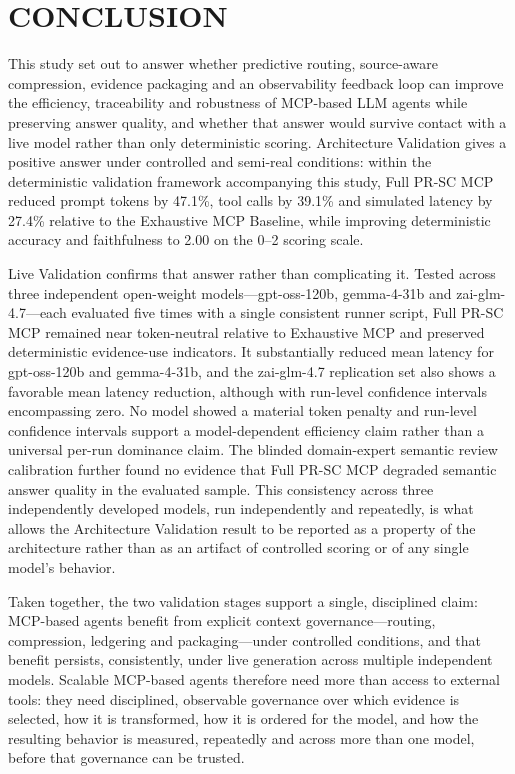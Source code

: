 \section{CONCLUSION}

This study set out to answer whether predictive routing, source-aware compression, evidence packaging and an observability feedback loop can improve the efficiency, traceability and robustness of MCP-based LLM agents while preserving answer quality, and whether that answer would survive contact with a live model rather than only deterministic scoring. Architecture Validation gives a positive answer under controlled and semi-real conditions: within the deterministic validation framework accompanying this study, Full PR-SC MCP reduced prompt tokens by 47.1\%, tool calls by 39.1\% and simulated latency by 27.4\% relative to the Exhaustive MCP Baseline, while improving deterministic accuracy and faithfulness to 2.00 on the 0--2 scoring scale.

Live Validation confirms that answer rather than complicating it. Tested across three independent open-weight models---gpt-oss-120b, gemma-4-31b and zai-glm-4.7---each evaluated five times with a single consistent runner script, Full PR-SC MCP remained near token-neutral relative to Exhaustive MCP and preserved deterministic evidence-use indicators. It substantially reduced mean latency for gpt-oss-120b and gemma-4-31b, and the zai-glm-4.7 replication set also shows a favorable mean latency reduction, although with run-level confidence intervals encompassing zero. No model showed a material token penalty and run-level confidence intervals support a model-dependent efficiency claim rather than a universal per-run dominance claim. The blinded domain-expert semantic review calibration further found no evidence that Full PR-SC MCP degraded semantic answer quality in the evaluated sample. This consistency across three independently developed models, run independently and repeatedly, is what allows the Architecture Validation result to be reported as a property of the architecture rather than as an artifact of controlled scoring or of any single model's behavior.

Taken together, the two validation stages support a single, disciplined claim: MCP-based agents benefit from explicit context governance---routing, compression, ledgering and packaging---under controlled conditions, and that benefit persists, consistently, under live generation across multiple independent models. Scalable MCP-based agents therefore need more than access to external tools: they need disciplined, observable governance over which evidence is selected, how it is transformed, how it is ordered for the model, and how the resulting behavior is measured, repeatedly and across more than one model, before that governance can be trusted.

